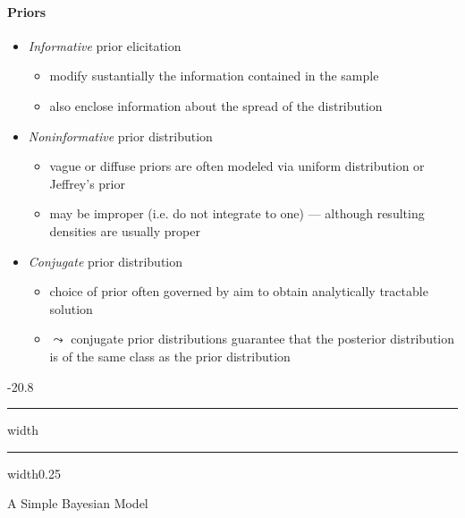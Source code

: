 \documentclass[a4paper,landscape,8pt,fleqn]{scrartcl}
\makeatletter
\renewcommand{\subsection}{\@startsection{subsection}{1}{0mm}%
{-2\baselineskip}{0.8\baselineskip}%
{\hrule depth 0.2pt width\columnwidth\hrule depth0.75pt
width0.25\columnwidth\vspace*{1.2em}\large\bfseries}}
\makeatother
\begin{document}
\begin{multicols*}{3}
\paragraph{Priors}
\begin{itemize}
\item \textit{Informative} prior elicitation
\begin{itemize}
\item modify sustantially the information contained in the sample
\item also enclose information about the spread of the distribution
\end{itemize}
\item \textit{Noninformative} prior distribution
\begin{itemize}
\item vague or diffuse priors are often modeled via uniform distribution or Jeffrey's prior
\item may be improper (i.e. do not integrate to one) --- although resulting densities are usually proper
\end{itemize}
\item \textit{Conjugate} prior distribution
\begin{itemize}
\item choice of prior often governed by aim to obtain analytically tractable solution
\item $\leadsto$ conjugate prior distributions guarantee that the posterior distribution is of the same class as the prior distribution
\end{itemize}
\end{itemize}

\subsection{A Simple Bayesian Model}


\end{multicols*}
\end{document}
